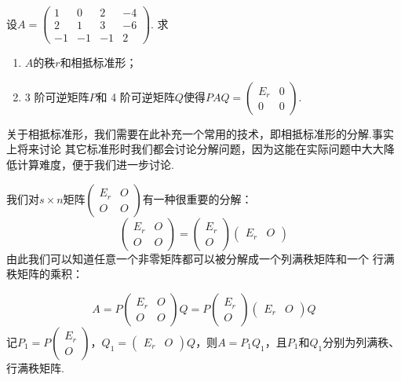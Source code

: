 \begin{example}
    设$A=\begin{pmatrix}
        1 & 0 & 2 & -4 \\ 2 & 1 & 3 & -6 \\ -1 & -1 & -1 & 2
    \end{pmatrix}$. 求
    \begin{enumerate}
        \item $A$的秩$r$和相抵标准形；

        \item 3 阶可逆矩阵$P$和 4 阶可逆矩阵$Q$使得$PAQ=\begin{pmatrix}
            E_r & 0 \\ 0 & 0
        \end{pmatrix}$.
    \end{enumerate}
\end{example}
\begin{solution}

\end{solution}

关于相抵标准形，我们需要在此补充一个常用的技术，即相抵标准形的分解.事实上将来讨论
其它标准形时我们都会讨论分解问题，因为这能在实际问题中大大降低计算难度，便于我们进一步讨论.

我们对$s \times n$矩阵$\begin{pmatrix}
    E_r & O \\ O & O
\end{pmatrix}$有一种很重要的分解：
\[\begin{pmatrix}
    E_r & O \\ O & O
\end{pmatrix}=\begin{pmatrix}
    E_r \\ O
\end{pmatrix}\begin{pmatrix}
    E_r & O
\end{pmatrix}\]
由此我们可以知道任意一个非零矩阵都可以被分解成一个列满秩矩阵和一个
行满秩矩阵的乘积：

\[A=P\begin{pmatrix}
    E_r & O \\ O & O
\end{pmatrix}Q=P\begin{pmatrix}
    E_r \\ O
\end{pmatrix}\begin{pmatrix}
    E_r & O
\end{pmatrix}Q\]
记$P_1=P\begin{pmatrix}
    E_r \\ O
\end{pmatrix}$，$Q_1=\begin{pmatrix}
    E_r & O
\end{pmatrix}Q$，则$A=P_1Q_1$，且$P_1$和$Q_1$分别为列满秩、行满秩矩阵.

